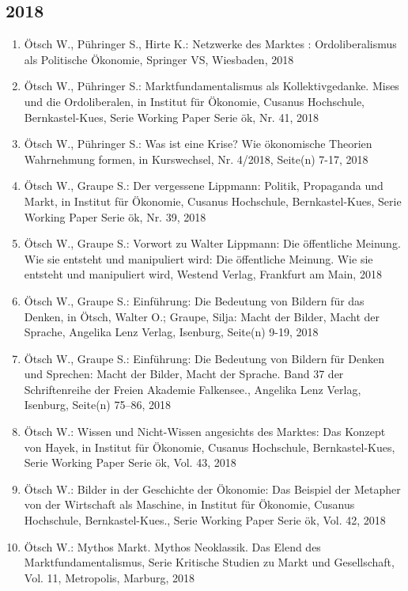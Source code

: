 \subsection*{2018}
\begin{enumerate}
    	 \item Ötsch W., Pühringer S., Hirte K.: Netzwerke des Marktes : Ordoliberalismus als Politische Ökonomie, Springer VS, Wiesbaden, 2018
	 \item Ötsch W., Pühringer S.: Marktfundamentalismus als Kollektivgedanke. Mises und die Ordoliberalen, in Institut für Ökonomie, Cusanus Hochschule, Bernkastel-Kues, Serie Working Paper Serie ök, Nr. 41, 2018
	 \item Ötsch W., Pühringer S.: Was ist eine Krise? Wie ökonomische Theorien Wahrnehmung formen, in Kurswechsel, Nr. 4/2018, Seite(n) 7-17, 2018
	 \item Ötsch W., Graupe S.: Der vergessene Lippmann: Politik, Propaganda und Markt, in Institut für Ökonomie, Cusanus Hochschule, Bernkastel-Kues, Serie Working Paper Serie ök, Nr. 39, 2018
	 \item Ötsch W., Graupe S.: Vorwort zu Walter Lippmann: Die öffentliche Meinung. Wie sie entsteht und manipuliert wird: Die öffentliche Meinung. Wie sie entsteht und manipuliert wird, Westend Verlag, Frankfurt am Main, 2018
	 \item Ötsch W., Graupe S.: Einführung: Die Bedeutung von Bildern für das Denken, in Ötsch, Walter O.; Graupe, Silja: Macht der Bilder, Macht der Sprache, Angelika Lenz Verlag, Isenburg, Seite(n) 9-19, 2018
	 \item Ötsch W., Graupe S.: Einführung: Die Bedeutung von Bildern für Denken und Sprechen: Macht der Bilder, Macht der Sprache. Band 37 der Schriftenreihe der Freien Akademie Falkensee., Angelika Lenz Verlag, Isenburg, Seite(n) 75–86, 2018
	 \item Ötsch W.: Wissen und Nicht-Wissen angesichts \glqq des Marktes\grqq{}: Das Konzept von Hayek, in Institut für Ökonomie, Cusanus Hochschule, Bernkastel-Kues, Serie Working Paper Serie ök, Vol. 43, 2018
	 \item Ötsch W.: Bilder in der Geschichte der Ökonomie: Das Beispiel der Metapher von der Wirtschaft als Maschine, in Institut für Ökonomie, Cusanus Hochschule, Bernkastel-Kues., Serie Working Paper Serie ök, Vol. 42, 2018
	 \item Ötsch W.: Mythos Markt. Mythos Neoklassik. Das Elend des Marktfundamentalismus, Serie Kritische Studien zu Markt und Gesellschaft, Vol. 11, Metropolis, Marburg, 2018

\end{enumerate}
